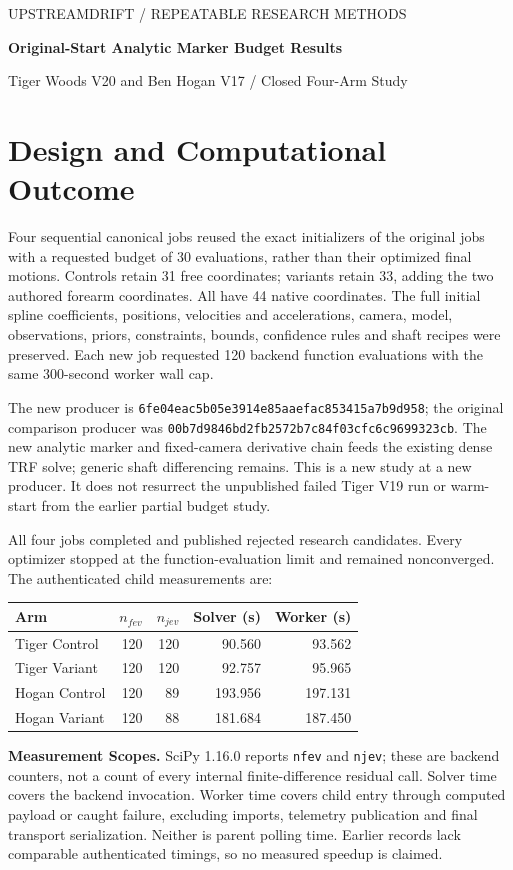 \documentclass[11pt,letterpaper]{article}
\newcommand{\code}[1]{\nolinkurl{#1}}\newcommand{\hash}[1]{{\footnotesize\nolinkurl{#1}}}
\begin{document}
{\large\textcolor{accent}{UPSTREAMDRIFT / REPEATABLE RESEARCH METHODS}}\par
{\LARGE\bfseries\textcolor{ink}{Original-Start Analytic Marker Budget Results}}\par
Tiger Woods V20 and Ben Hogan V17 / Closed Four-Arm Study
\section{Design and Computational Outcome}
Four sequential canonical jobs reused the exact initializers of the original jobs with a requested budget of 30 evaluations, rather than their optimized final motions. Controls retain 31 free coordinates; variants retain 33, adding the two authored forearm coordinates. All have 44 native coordinates. The full initial spline coefficients, positions, velocities and accelerations, camera, model, observations, priors, constraints, bounds, confidence rules and shaft recipes were preserved. Each new job requested 120 backend function evaluations with the same 300-second worker wall cap.

The new producer is \hash{6fe04eac5b05e3914e85aaefac853415a7b9d958}; the original comparison producer was \hash{00b7d9846bd2fb2572b7c84f03cfc6c9699323cb}. The new analytic marker and fixed-camera derivative chain feeds the existing dense TRF solve; generic shaft differencing remains. This is a new study at a new producer. It does not resurrect the unpublished failed Tiger V19 run or warm-start from the earlier partial budget study.

All four jobs completed and published rejected research candidates. Every optimizer stopped at the function-evaluation limit and remained nonconverged. The authenticated child measurements are:
\begin{center}\small
\begin{tabular}{@{}lrrrr@{}}\toprule
Arm & $n_{fev}$ & $n_{jev}$ & Solver (s) & Worker (s)\\\midrule
Tiger Control & 120 & 120 & 90.560 & 93.562\\
Tiger Variant & 120 & 120 & 92.757 & 95.965\\
Hogan Control & 120 & 89 & 193.956 & 197.131\\
Hogan Variant & 120 & 88 & 181.684 & 187.450\\
\bottomrule\end{tabular}
\end{center}

\textbf{Measurement Scopes.} SciPy 1.16.0 reports \code{nfev} and \code{njev}; these are backend counters, not a count of every internal finite-difference residual call. Solver time covers the backend invocation. Worker time covers child entry through computed payload or caught failure, excluding imports, telemetry publication and final transport serialization. Neither is parent polling time. Earlier records lack comparable authenticated timings, so no measured speedup is claimed.
\clearpage
\end{document}
